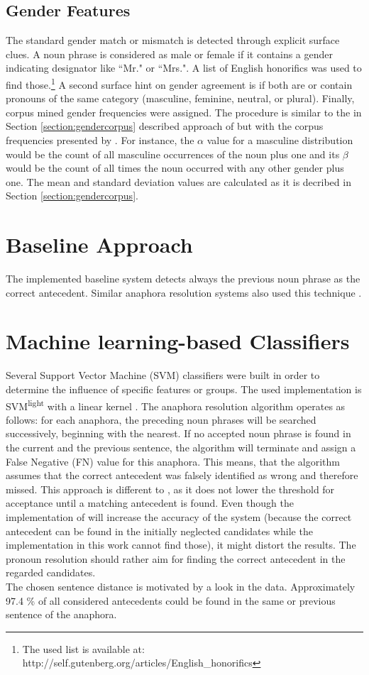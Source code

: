\subsection{Gender Features}
The standard gender match or mismatch is detected through explicit surface clues. A noun phrase is considered as male or female if it contains a gender indicating designator like ``Mr." or ``Mrs.". A list of English honorifics was used to find those.\footnote{The used list is available at: http://self.gutenberg.org/articles/English\_honorifics} A second surface hint on gender agreement is if both are or contain pronouns of the same category (masculine, feminine, neutral, or plural).
Finally, corpus mined gender frequencies were assigned. The procedure is similar to the in Section \ref{section:gendercorpus} described approach of \cite{bergsma2005automatic} but with the corpus frequencies presented by \cite{Bergsma:06}. For instance, the $\alpha$ value for a masculine distribution would be the count of all masculine occurrences of the noun plus one and its $\beta$ would be the count of all times the noun occurred with any other gender plus one. The mean and standard deviation values are calculated as it is decribed in Section \ref{section:gendercorpus}.

\section{Baseline Approach}
The implemented baseline system detects always the previous noun phrase as the correct antecedent. Similar anaphora resolution systems also used this technique \citep{poesio2004general,bergsma2005automatic}.

\section{Machine learning-based Classifiers}
Several Support Vector Machine (SVM) classifiers were built in order to determine the influence of specific features or groups. The used implementation is SVM\textsuperscript{light} with a linear kernel \citep{joachims1999svmlight}. The anaphora resolution algorithm operates as follows: for each anaphora, the preceding noun phrases will be searched successively, beginning with the nearest. If no accepted noun phrase is found in the current and the previous sentence, the algorithm will terminate and assign a False Negative (FN) value for this anaphora. This means, that the algorithm assumes that the correct antecedent was falsely identified as wrong and therefore missed. This approach is different to \cite{bergsma2005automatic}, as it does not lower the threshold for acceptance until a matching antecedent is found. Even though the implementation of \cite{bergsma2005automatic} will increase the accuracy of the system (because the correct antecedent can be found in the initially neglected candidates while the implementation in this work cannot find those), it might distort the results. The pronoun resolution should rather aim for finding the correct antecedent in the regarded candidates.\\
 The chosen sentence distance is motivated by a look in the data. Approximately 97.4 \% of all considered antecedents could be found in the same or previous sentence of the anaphora.